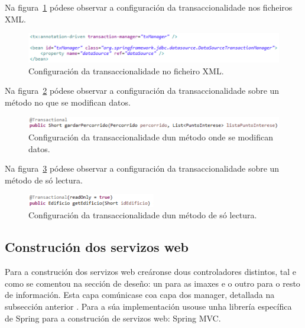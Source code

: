 Na figura~\ref{fig:transaccionConfiguracion} pódese observar a configuración da transaccionalidade nos ficheiros XML.

\begin{figure}[tbh] 
	\begin{center}
		\includegraphics[width=1\textwidth]{figures/codigo/transaccionConfiguracion}
		\caption{Configuración da transaccionalidade no ficheiro XML.}
		\label{fig:transaccionConfiguracion}
	\end{center}
\end{figure}


Na figura~\ref{fig:metodoTransaccional} pódese observar a configuración da transaccionalidade sobre un método no que se modifican datos.

\begin{figure}[tbh] 
	\begin{center}
		\includegraphics[width=1\textwidth]{figures/codigo/metodoTransaccional}
		\caption{Configuración da transaccionalidade dun método onde se modifican datos.}
		\label{fig:metodoTransaccional}
	\end{center}
\end{figure}

Na figura~\ref{fig:metodoNonTransaccional} pódese observar a configuración da transaccionalidade sobre un método de só lectura.

\begin{figure}[tbh] 
	\begin{center}
		\includegraphics[width=0.5\textwidth]{figures/codigo/metodoNonTransaccional}
		\caption{Configuración da transaccionalidade dun método de só lectura.}
		\label{fig:metodoNonTransaccional}
	\end{center}
\end{figure}


\subsection{Construción dos servizos web}
Para a construción dos servizos web creáronse dous controladores distintos, tal e como se comentou na sección de deseño: un para as imaxes e o outro para o resto de información. Esta capa comúnicase coa capa dos manager, detallada na subsección anterior . Para a súa implementación usouse unha librería específica de Spring para a construción de servizos web: Spring MVC.


